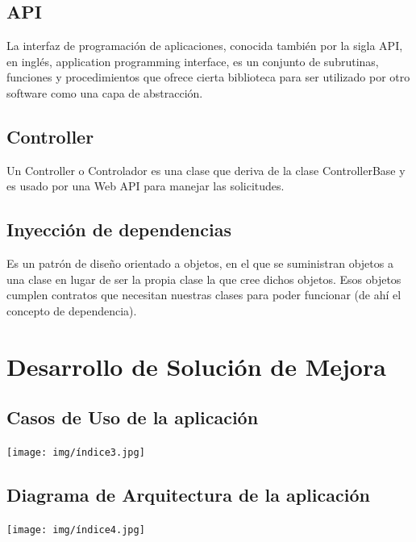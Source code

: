 \documentclass[12pt,letterpaper]{article}
\begin{document}
\subsection{API}

La interfaz de programación de aplicaciones, conocida también por la sigla API, en inglés, application programming interface, es un conjunto de subrutinas, funciones y procedimientos que ofrece cierta biblioteca para ser utilizado por otro software como una capa de abstracción.

\subsection{Controller}

Un Controller o Controlador es una clase que deriva de la clase ControllerBase y es usado por una Web API para manejar las solicitudes.

\subsection{Inyección de dependencias}

Es un patrón de diseño orientado a objetos, en el que se suministran objetos a una clase en lugar de ser la propia clase la que cree dichos objetos. Esos objetos cumplen contratos que necesitan nuestras clases para poder funcionar (de ahí el concepto de dependencia).



\section{ Desarrollo de Solución de Mejora}

\subsection{Casos de Uso de la aplicación}

\begin{center}
    \texttt{[image: img/índice3.jpg]}  
\end{center}

\subsection{Diagrama de Arquitectura de la aplicación}

\begin{center}
    \texttt{[image: img/índice4.jpg]}  
\end{center}
\end{document}
